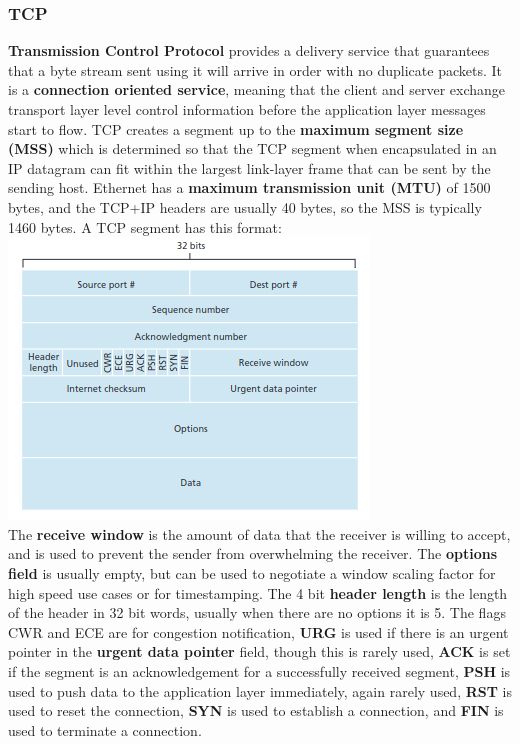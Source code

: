\subsubsection{TCP}
\textbf{Transmission Control Protocol} provides a delivery service that guarantees that a byte stream sent using it will arrive in order with no duplicate packets. It is a \textbf{connection oriented service}, meaning that the client and server exchange transport layer level control information before the application layer messages start to flow. TCP creates a segment up to the \textbf{maximum segment size (MSS)} which is determined so that the TCP segment when encapsulated in an IP datagram can fit within the largest link-layer frame that can be sent by the sending host. Ethernet has a \textbf{maximum transmission unit (MTU)} of 1500 bytes, and the TCP+IP headers are usually 40 bytes, so the MSS is typically 1460 bytes. A TCP segment has this format:\\
\includegraphics[width=\linewidth]{../images/w5n2tcpSegmentStructure.png}\\
The \textbf{receive window} is the amount of data that the receiver is willing to accept, and is used to prevent the sender from overwhelming the receiver. The \textbf{options field} is usually empty, but can be used to negotiate a window scaling factor for high speed use cases or for timestamping. The 4 bit \textbf{header length} is the length of the header in 32 bit words, usually when there are no options it is 5. The flags CWR and ECE are for congestion notification, \textbf{URG} is used if there is an urgent pointer in the \textbf{urgent data pointer} field, though this is rarely used, \textbf{ACK} is set if the segment is an acknowledgement for a successfully received segment, \textbf{PSH} is used to push data to the application layer immediately, again rarely used, \textbf{RST} is used to reset the connection, \textbf{SYN} is used to establish a connection, and \textbf{FIN} is used to terminate a connection.\\
